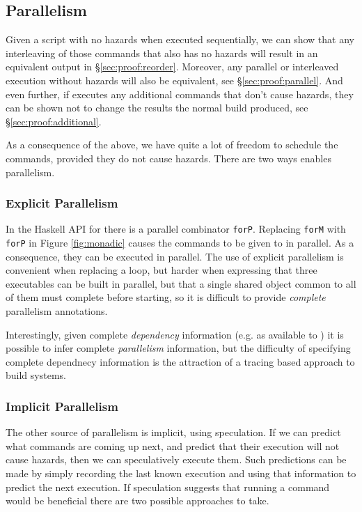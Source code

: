 \subsection{Parallelism}

Given a script with no hazards when executed sequentially, we can show that any interleaving of those commands that also has no hazards will result in an equivalent output in \S\ref{sec:proof:reorder}. Moreover, any parallel or interleaved execution without hazards will also be equivalent, see \S\ref{sec:proof:parallel}. And even further, if \Rattle executes any additional commands that don't cause hazards, they can be shown not to change the results the normal build produced, see \S\ref{sec:proof:additional}.

As a consequence of the above, we have quite a lot of freedom to schedule the commands, provided they do not cause hazards.  There are two ways \Rattle enables parallelism.

\subsubsection{Explicit Parallelism}

In the Haskell API for \Rattle there is a parallel combinator \texttt{forP}. Replacing \texttt{forM} with \texttt{forP} in Figure \ref{fig:monadic} causes the commands to be given to \Rattle in parallel. As a consequence, they can be executed in parallel. The use of explicit parallelism is convenient when replacing a loop, but harder when expressing that three executables can be built in parallel, but that a single shared object common to all of them must complete before starting, so it is difficult to provide \emph{complete} parallelism annotations.

Interestingly, given complete \emph{dependency} information (e.g. as available to \Make) it is possible to infer complete \emph{parallelism} information, but the difficulty of specifying complete dependnecy information is the attraction of a tracing based approach to build systems.

\subsubsection{Implicit Parallelism}
\label{sec:speculation}

The other source of parallelism is implicit, using speculation. If we can predict what commands are coming up next, and predict that their execution will not cause hazards, then we can speculatively execute them.  Such predictions can be made by simply recording the last known execution and using that information to predict the next execution.  If speculation suggests that running a command would be beneficial there are two possible approaches to take.

